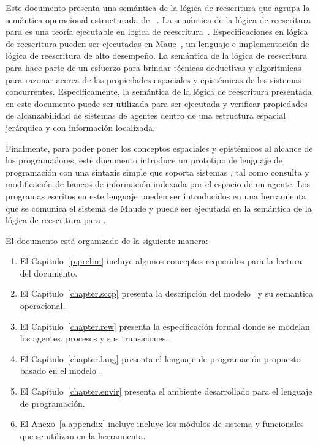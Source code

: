 Este documento presenta una sem\'antica de la l\'ogica de reescritura que agrupa la sem\'antica operacional estructurada de \SCCP~\cite{knight:hal-00761116}. La sem\'antica de la l\'ogica de reescritura para \SCCP es una teor\'ia ejecutable en logica de reescritura~\cite{Meseguer199273}. Especificaciones en l\'ogica de reescritura pueden ser ejecutadas en Maue~\cite{maude-book}, un lenguaje e implementaci\'on de l\'ogica de reescritura de alto desempe\~no. La sem\'antica de la l\'ogica de reescritura para \SCCP hace parte de un esfuerzo para brindar t\'ecnicas deductivas y algor\'itmicas para razonar acerca de las propiedades espaciales y epist\'emicas de los sistemas concurrentes. Espec\'ificamente, la sem\'antica de la l\'ogica de reescritura presentada en este documento puede ser utilizada para ser ejecutada y verificar propiedades de alcanzabilidad de sistemas de agentes dentro de una estructura espacial jer\'arquica y con informaci\'on localizada.

Finalmente, para poder poner los conceptos espaciales y epist\'emicos al alcance de los programadores, este documento introduce un prototipo de lenguaje de programaci\'on con una sintaxis simple que soporta sistemas \SCCP, tal como consulta y modificaci\'on de bancos de informaci\'on indexada por el espacio de un agente. Los programas escritos en este lenguaje pueden ser introducidos en una herramienta que se comunica el sistema de Maude y puede ser ejecutada en la sem\'antica de la l\'ogica de reescritura para \SCCP.

El documento est\'a organizado de la siguiente manera:
\begin{enumerate}
\item El Capitulo~\ref{p.prelim} incluye algunos conceptos requeridos para la lectura del documento.
\item El Cap\'itulo~\ref{chapter.sccp} presenta la descripci\'on del modelo \SCCP \ y su semantica operacional.
\item El Cap\'itulo~\ref{chapter.rew} presenta la especificaci\'on formal donde se modelan los agentes, procesos y sus transiciones. 
\item El Cap\'itulo~\ref{chapter.lang} presenta el lenguaje de programaci\'on propuesto basado en el modelo \SCCP.
\item El Cap\'itulo~\ref{chapter.envir} presenta el ambiente desarrollado para el lenguaje de programaci\'on.
\item El Anexo~\ref{a.appendix} incluye incluye los m\'odulos de sistema y funcionales que se utilizan en la herramienta.
\end{enumerate}
